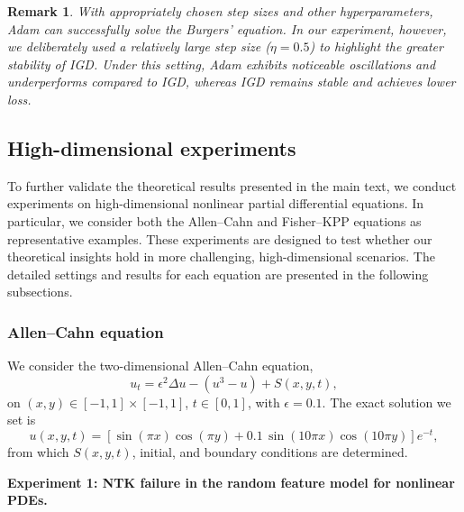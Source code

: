 \documentclass{article}
\newtheorem{remark}{Remark}
\begin{document}
\begin{remark}
With appropriately chosen step sizes and other hyperparameters, Adam can successfully solve the Burgers' equation. In our experiment, however, we deliberately used a relatively large step size ($\eta=0.5$) to highlight the greater stability of IGD. Under this setting, Adam exhibits noticeable oscillations and underperforms compared to IGD, whereas IGD remains stable and achieves lower loss.
\end{remark}
\fi
\subsection{High-dimensional experiments}\label{sec:high dim}
To further validate the theoretical results presented in the main text, we conduct experiments on high-dimensional nonlinear partial differential equations. 
In particular, we consider both the Allen--Cahn and Fisher--KPP equations as representative examples. 
These experiments are designed to test whether our theoretical insights hold in more challenging, high-dimensional scenarios. 
The detailed settings and results for each equation are presented in the following subsections.

\subsubsection{Allen--Cahn equation}\label{sec:allen-cahn}
We consider the two-dimensional Allen–Cahn equation,
\begin{equation}
u_t = \epsilon^2 \Delta u  - (u^3-u) + S(x, y, t), \label{eq:allen}
\end{equation}
on $(x, y) \in [-1, 1]\times[-1,1]$, $ t \in [0, 1]$, with $\epsilon = 0.1$. 
The exact solution we set is
$$
u(x, y, t) = [\sin(\pi x)\cos(\pi y) + 0.1\,\sin(10\pi x)\cos(10\pi y)] e^{-t},
$$
from which $S(x, y, t)$, initial, and boundary conditions are determined.  

\textbf{Experiment 1: NTK failure in the random feature model for nonlinear PDEs.}
\end{document}
